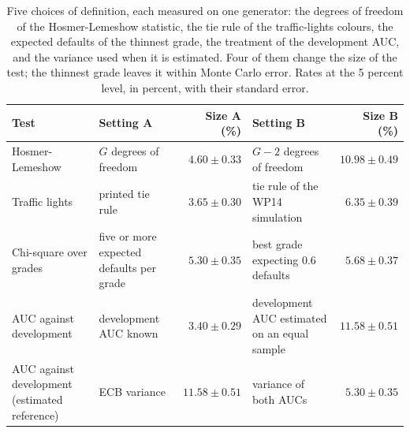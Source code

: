 \begin{table}[htbp]
\centering
\setlength{\tabcolsep}{3pt}
\footnotesize
\caption{Five choices of definition, each measured on one generator: the degrees of freedom of the Hosmer-Lemeshow statistic, the tie rule of the traffic-lights colours, the expected defaults of the thinnest grade, the treatment of the development AUC, and the variance used when it is estimated. Four of them change the size of the test; the thinnest grade leaves it within Monte Carlo error. Rates at the 5 percent level, in percent, with their standard error.}
\label{tab:vt-settings}
\begin{tabular}{p{2.8cm}p{2.4cm}rp{2.8cm}r}
\toprule
Test & Setting A & Size A (\%) & Setting B & Size B (\%) \\
\midrule
Hosmer-Lemeshow & $G$ degrees of freedom & $4.60\pm0.33$ & $G-2$ degrees of freedom & $10.98\pm0.49$ \\
Traffic lights & printed tie rule & $3.65\pm0.30$ & tie rule of the WP14 simulation & $6.35\pm0.39$ \\
Chi-square over grades & five or more expected defaults per grade & $5.30\pm0.35$ & best grade expecting 0.6 defaults & $5.68\pm0.37$ \\
AUC against development & development AUC known & $3.40\pm0.29$ & development AUC estimated on an equal sample & $11.58\pm0.51$ \\
AUC against development (estimated reference) & ECB variance & $11.58\pm0.51$ & variance of both AUCs & $5.30\pm0.35$ \\
\bottomrule
\end{tabular}
\end{table}
